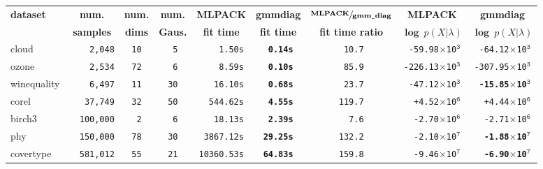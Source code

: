 \documentclass[10pt,a4paper]{article}
\def\_{{\tt\char95}}
\begin{document}
\begin{table}[!tb]
\centering
\small
\begin{tabular}{|l|c|c|c|c|c|c|c|c|}
\hline
\multirow{2}{*}{\bfseries dataset} & {\bfseries num.}    & {\bfseries num.} & {\bfseries num.}  & {\bfseries MLPACK}   & {\bfseries {gmm\_diag}} & $\sfrac{\mbox{\bfseries MLPACK}}{\mbox{\bfseries gmm\_diag}}$ & {\bfseries MLPACK}             & {\bfseries {gmm\_diag}}        \\
                                   & {\bfseries samples} & {\bfseries dims} & {\bfseries Gaus.} & {\bfseries fit time} & {\bfseries fit time}    & {\bfseries fit time ratio}                                    & {$\mathbf \log~p(X|\lambda) $} & {$\mathbf \log~p(X|\lambda) $} \\
\hline
  cloud       & {\tt ~~~~2,048} & {\tt 10} & {\tt ~5} & {\tt ~~~~1.50s} &  {\tt\bfseries ~0.14s} & {\tt ~10.7} & {\tt~-59.98{\tiny$\times$}10$^{\mathtt 3}$} & {\tt          ~-64.12{\tiny$\times$}10$^{\mathtt 3}$} \\
  ozone       & {\tt ~~~~2,534} & {\tt 72} & {\tt ~6} & {\tt ~~~~8.59s} &  {\tt\bfseries ~0.10s} & {\tt ~85.9} & {\tt-226.13{\tiny$\times$}10$^{\mathtt 3}$} & {\tt          -307.95{\tiny$\times$}10$^{\mathtt 3}$} \\
  winequality & {\tt ~~~~6,497} & {\tt 11} & {\tt 30} & {\tt ~~~16.10s} &  {\tt\bfseries ~0.68s} & {\tt ~23.7} & {\tt~-47.12{\tiny$\times$}10$^{\mathtt 3}$} & {\tt\bfseries ~-15.85{\tiny$\times$}10$^{\mathtt 3}$} \\
  corel       & {\tt ~~~37,749} & {\tt 32} & {\tt 50} & {\tt ~~544.62s} &  {\tt\bfseries ~4.55s} & {\tt 119.7} & {\tt~~+4.52{\tiny$\times$}10$^{\mathtt 6}$} & {\tt          ~~+4.44{\tiny$\times$}10$^{\mathtt 6}$} \\
  birch3      & {\tt ~~100,000} & {\tt ~2} & {\tt ~6} & {\tt ~~~18.13s} &  {\tt\bfseries ~2.39s} & {\tt ~~7.6} & {\tt~~-2.70{\tiny$\times$}10$^{\mathtt 6}$} & {\tt          ~~-2.71{\tiny$\times$}10$^{\mathtt 6}$} \\
  phy         & {\tt ~~150,000} & {\tt 78} & {\tt 30} & {\tt ~3867.12s} &  {\tt\bfseries 29.25s} & {\tt 132.2} & {\tt~~-2.10{\tiny$\times$}10$^{\mathtt 7}$} & {\tt\bfseries ~~-1.88{\tiny$\times$}10$^{\mathtt 7}$} \\
  covertype   & {\tt ~~581,012} & {\tt 55} & {\tt 21} & {\tt 10360.53s} &  {\tt\bfseries 64.83s} & {\tt 159.8} & {\tt~~-9.46{\tiny$\times$}10$^{\mathtt 7}$} & {\tt\bfseries ~~-6.90{\tiny$\times$}10$^{\mathtt 7}$} \\

\end{tabular}
\end{table}
\end{document}
